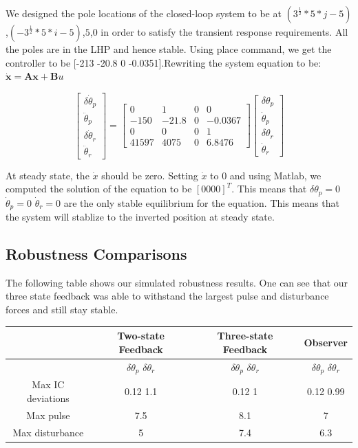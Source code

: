 We designed the pole locations of the closed-loop system to be at $(3^\frac{1}{2}*5*j - 5)$,$(-3^\frac{1}{2}*5*i - 5)$,$5$,$0$ in order to satisfy the transient response requirements. All the poles are in the LHP and hence stable. Using place command, we get the controller to be [-213 -20.8 0 -0.0351].Rewriting the system equation to be:
$\boldsymbol{\dot x = Ax+B}u$

$$
\begin{bmatrix}
\delta\dot\theta_p\\
\ddot\theta_p\\
\delta\dot\theta_r\\
\ddot\theta_r
\end{bmatrix}
=
\begin{bmatrix}
0 & 1 & 0 & 0\\
-150 & -21.8 & 0 & -0.0367\\
0 & 0 & 0 & 1\\
41597 & 4075 & 0 & 6.8476
\end{bmatrix}
\begin{bmatrix}
\delta\theta_p\\
\dot\theta_p\\
\delta\theta_r\\
\dot\theta_r
\end{bmatrix}
$$

At steady state, the $\dot x$ should be zero. Setting $\dot x$ to 0 and using Matlab, we computed the solution of the equation to be $[0 0 0 0]^T$. This means that  $\delta\theta_p=0$ $\dot\theta_p=0$  $\dot\theta_r=0$  are the only stable equilibrium for the equation.  This means that the system will stablize to the inverted position at steady state.

\subsection{Robustness Comparisons}
The following table shows our simulated robustness results. One can see that our three state feedback was able to withstand the largest pulse and disturbance forces and still stay stable.\\
\begin{tabular}{|c|c|c|c|}
\hline
 & Two-state Feedback & Three-state Feedback & Observer\\ \hline
 & $\delta\theta_p$  $\delta\theta_r$ & $\delta\theta_p$  $\delta\theta_r$ & $\delta\theta_p$  $\delta\theta_r$\\ \hline
Max IC deviations & 0.12  1.1 & 0.12  1 & 0.12  0.99\\ \hline
Max pulse & 7.5 & 8.1 & 7\\ \hline
Max disturbance & 5 & 7.4 & 6.3\\
\hline
\end{tabular}
